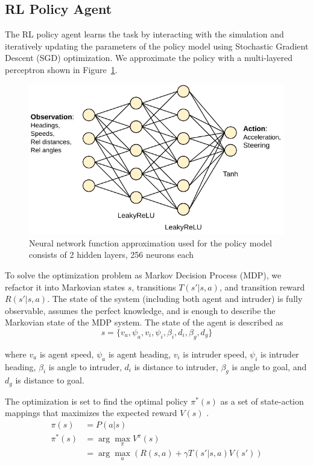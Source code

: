 \subsection{RL Policy Agent}

The RL policy agent learns the task by interacting with the simulation and iteratively updating the parameters of the policy model using Stochastic Gradient Descent (SGD) optimization. We approximate the policy with a multi-layered perceptron shown in Figure~\ref{fig:policy_model}.

\begin{figure}[h]
	\centering
	\includegraphics[width=0.8\columnwidth]{figures/model.pdf}
	\caption{Neural network function approximation used for the policy model consists of 2 hidden layers, 256 neurons each}
	\label{fig:policy_model}
\end{figure}

To solve the optimization problem as Markov Decision Process (MDP), we refactor it into Markovian states $s$, transitions  $T(s' | s, a)$, and transition reward $R(s' | s, a)$. 
The state of the system (including both agent and intruder) is fully observable, assumes the perfect knowledge, and is enough to describe the Markovian state of the MDP system.
The state of the agent is described as
$$ s = \{ v_a, \psi_a, v_i, \psi_i, \beta_i, d_i, \beta_g, d_g \}$$

\noindent where 
$v_a$ is agent speed,
$\psi_a$ is agent heading,
$v_i$ is intruder speed,
$\psi_i$ is intruder heading,
$\beta_i$ is angle to intruder,
$d_i$ is distance to intruder,
$\beta_g$ is angle to goal, and
$d_g$ is distance to goal. 

The optimization is set to find the optimal policy $\pi^*(s)$ as a set of state-action mappings that maximizes the expected reward $V(s)$ \cite{sutton2018reinforcement}.
\begin{align} 
	\pi(s) &= P(a | s) \\
	\pi^*(s) &= \arg\max_{\pi} V^\pi (s) \\
	&= \arg\max_a \left( R(s,a) + \gamma T(s'|s,a) V(s') \right)
\end{align} 

